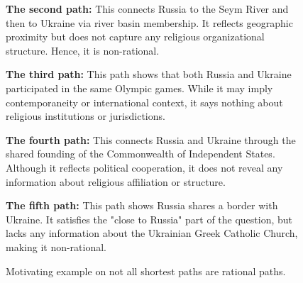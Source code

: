 \begin{figure}[t]
\begin{tcolorbox}[colback=gray!5!white,
                  colframe=gray!75!black,
                  title=WebQTrn-3763\_c707414f103503f2530fc654a85645fe]
{\textbf{The second path:} This connects Russia to the Seym River and then to Ukraine via river basin membership. It reflects geographic proximity but does not capture any religious organizational structure. Hence, it is non-rational.\par\vspace{6pt}

\textbf{The third path:} This path shows that both Russia and Ukraine participated in the same Olympic games. While it may imply contemporaneity or international context, it says nothing about religious institutions or jurisdictions.\par\vspace{6pt}

\textbf{The fourth path:} This connects Russia and Ukraine through the shared founding of the Commonwealth of Independent States. Although it reflects political cooperation, it does not reveal any information about religious affiliation or structure.\par\vspace{6pt}

\textbf{The fifth path:} This path shows Russia shares a border with Ukraine. It satisfies the "close to Russia" part of the question, but lacks any information about the Ukrainian Greek Catholic Church, making it non-rational.\par}

\end{tcolorbox}
\caption{Motivating example on not all shortest paths are rational paths.}
\label{fig:type1_no4}
\end{figure}


